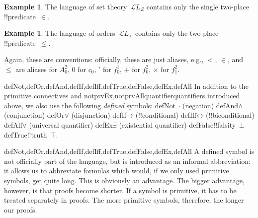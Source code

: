 \documentclass[10pt,a4paper]{article}
\theoremstyle{plain}
\theoremstyle{definition}
\newtheorem{ex}[thm]{Example}
\theoremstyle{remark}
\newenvironment{explain}{}{}
\providecommand{\lif}{\mathbin{\rightarrow}}
\providecommand{\lforall}{\mathord{\forall}}
\providecommand{\lexists}{\mathord{\exists}}
\providecommand{\ltrue}{\top}
\providecommand{\lfalse}{\bot}
\providecommand{\Obj}{}
\providecommand{\Lang}{\ensuremath{\mathcal{L}}}
\providecommand{\iftag}[1]{#1}
\providecommand{\liff}{\mathbin{\leftrightarrow}}
\providecommand{\iftag}{}
\begin{document}
\begin{ex}
The language of set theory~$\Lang L_Z$ contains only the single
two-place !!{predicate}~$\in$.
\end{ex}

\begin{ex}
The language of orders~$\Lang L_\le$ contains only the two-place
!!{predicate}~$\le$.
\end{ex}

Again, these are conventions: officially, these are just aliases,
e.g., $<$, $\in$, and $\le$ are aliases for $\Obj A^2_0$, $\Obj 0$ for
$\Obj c_0$, $\prime$ for $\Obj f^1_0$, $+$ for $\Obj f^2_0$, $\times$ for
$\Obj f^2_1$.

\iftag{defNot,defOr,defAnd,defIf,defIff,defTrue,defFalse,defEx,defAll}{%
In addition to the primitive connectives and
\iftag{notprvEx,notprvAll}{quantifier}{quantifiers} introduced
above, we also use the following \emph{defined} symbols:
\startycommalist
  \iftag{defNot}{\ycomma $\lnot$ (negation)}{}%
  \iftag{defAnd}{\ycomma $\land$ (conjunction)}{}%
  \iftag{defOr}{\ycomma $\lor$ (disjunction)}{}%
  \iftag{defIf}{\ycomma $\lif$ (!!{conditional})}{}%
  \iftag{defIff}{\ycomma $\liff$ (!!{biconditional})}{}%
  \iftag{defAll}{\ycomma $\lforall$ (universal quantifier)}{}%
  \iftag{defEx}{\ycomma $\lexists$ (existential quantifier)}{}%
  \iftag{defFalse}{\ycomma !!{falsity}~$\lfalse$}{}%
  \iftag{defTrue}{\ycomma !!{truth}~$\ltrue$}}{}.

\begin{tagblock}{defNot,defOr,defAnd,defIf,defIff,defTrue,defFalse,defEx,defAll}
\begin{explain}
A defined symbol is not officially part of the language, but is
introduced as an informal abbreviation: it allows us to abbreviate
formulas which would, if we only used primitive symbols, get quite
long.  This is obviously an advantage.  The bigger advantage, however,
is that proofs become shorter.  If a symbol is primitive, it has to be
treated separately in proofs. The more primitive symbols, therefore,
the longer our proofs.
\end{explain}
\end{tagblock}

\end{document}
